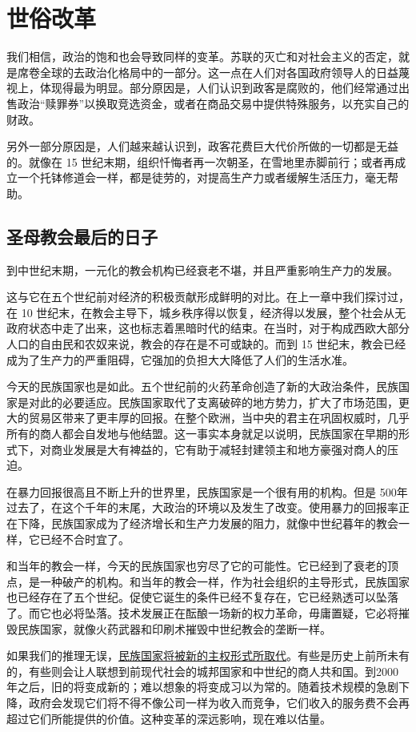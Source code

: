 \section{世俗改革}
我们相信，政治的饱和也会导致同样的变革。苏联的灭亡和对社会主义的否定，就是席卷全球的去政治化格局中的一部分。这一点在人们对各国政府领导人的日益蔑视上，体现得最为明显。部分原因是，人们认识到政客是腐败的，他们经常通过出售政治“赎罪券”以换取竞选资金，或者在商品交易中提供特殊服务，以充实自己的财政。

另外一部分原因是，人们越来越认识到，政客花费巨大代价所做的一切都是无益的。就像在 15 世纪末期，组织忏悔者再一次朝圣，在雪地里赤脚前行；或者再成立一个托钵修道会一样，都是徒劳的，对提高生产力或者缓解生活压力，毫无帮助。

\subsection{圣母教会最后的日子}
到中世纪末期，一元化的教会机构已经衰老不堪，并且严重影响生产力的发展。

这与它在五个世纪前对经济的积极贡献形成鲜明的对比。在上一章中我们探讨过，在 10 世纪末，在教会主导下，城乡秩序得以恢复，经济得以发展，整个社会从无政府状态中走了出来，这也标志着黑暗时代的结束。在当时，对于构成西欧大部分人口的自由民和农奴来说，教会的存在是不可或缺的。而到 15 世纪末，教会已经成为了生产力的严重阻碍，它强加的负担大大降低了人们的生活水准。

今天的民族国家也是如此。五个世纪前的火药革命创造了新的大政治条件，民族国家是对此的必要适应。民族国家取代了支离破碎的地方势力，扩大了市场范围，更大的贸易区带来了更丰厚的回报。在整个欧洲，当中央的君主在巩固权威时，几乎所有的商人都会自发地与他结盟。这一事实本身就足以说明，民族国家在早期的形式下，对商业发展是大有裨益的，它有助于减轻封建领主和地方豪强对商人的压迫。

在暴力回报很高且不断上升的世界里，民族国家是一个很有用的机构。但是 500年过去了，在这个千年的末尾，大政治的环境以及发生了改变。使用暴力的回报率正在下降，民族国家成为了经济增长和生产力发展的阻力，就像中世纪暮年的教会一样，它已经不合时宜了。

和当年的教会一样，今天的民族国家也穷尽了它的可能性。它已经到了衰老的顶点，是一种破产的机构。和当年的教会一样，作为社会组织的主导形式，民族国家也已经存在了五个世纪。促使它诞生的条件已经不复存在，它已经熟透可以坠落了。而它也必将坠落。技术发展正在酝酿一场新的权力革命，毋庸置疑，它必将摧毁民族国家，就像火药武器和印刷术摧毁中世纪教会的垄断一样。

如果我们的推理无误，\uline{民族国家将被新的主权形式所取代}。有些是历史上前所未有的，有些则会让人联想到前现代社会的城邦国家和中世纪的商人共和国。到2000 年之后，旧的将变成新的；难以想象的将变成习以为常的。随着技术规模的急剧下降，政府会发现它们将不得不像公司一样为收入而竞争，它们收入的服务费不会再超过它们所能提供的价值。这种变革的深远影响，现在难以估量。

